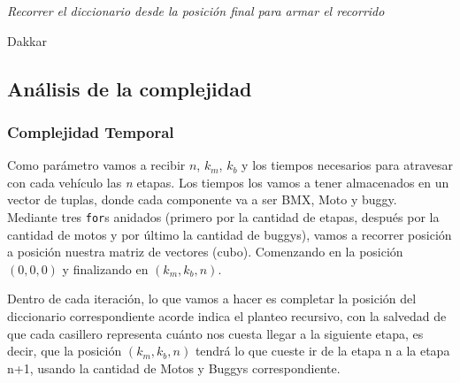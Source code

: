 \IncMargin{1em}
\begin{algorithm}
\BlankLine
\BlankLine
{}
\BlankLine
\emph{Recorrer el diccionario desde la posici\'on final para armar el recorrido}\;
\caption{Dakkar}%
\end{algorithm}\DecMargin{1em}

\newpage

\subsection{An\'alisis de la complejidad}

\subsubsection{Complejidad Temporal}

Como par\'ametro vamos a recibir $n$, $k_m$, $k_b$ y los tiempos necesarios para atravesar con cada veh\'iculo las \emph{n} etapas. Los tiempos los vamos a tener almacenados en un vector de tuplas, donde cada componente va a ser BMX, Moto y buggy.\\

Mediante tres \texttt{for}s anidados (primero por la cantidad de etapas, despu\'es por la cantidad de motos y por \'ultimo la cantidad de buggys), vamos a recorrer posici\'on a posici\'on nuestra matriz de vectores (cubo). Comenzando en la posici\'on $(0,0,0)$ y finalizando en  $(k_{m},k_{b},n)$.

Dentro de cada iteraci\'on, lo que vamos a hacer es completar la posici\'on del diccionario correspondiente acorde indica el planteo recursivo, con la salvedad de que cada casillero representa cu\'anto nos cuesta llegar a la siguiente etapa, es decir, que la posici\'on $(k_{m},k_{b},n)$ tendr\'a lo que cueste ir de la etapa n a la etapa n+1, usando la cantidad de Motos y Buggys correspondiente.\\


